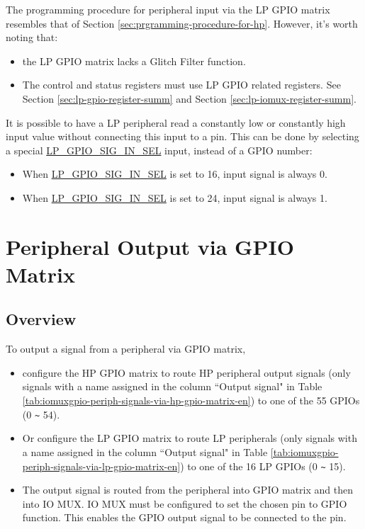 \documentclass[main\_\_EN.tex]{subfiles}
\begin{document}
The programming procedure for peripheral input via the LP GPIO matrix resembles that of Section \ref{sec:prgramming-procedure-for-hp}. However, it's worth noting that:\\
\begin{itemize}
    \item the LP GPIO matrix lacks a Glitch Filter function.
    \item The control and status registers must use LP GPIO related registers. See Section \ref{sec:lp-gpio-register-summ} and Section \ref{sec:lp-iomux-register-summ}.
\end{itemize}
\begin{tiplisting}
It is possible to have a LP peripheral read a constantly low or constantly high input value without connecting this input to a pin. This can be done by selecting a special \hyperref[fielddesc:LPGPIOSIGNINSEL]{LP\_GPIO\_SIG\_IN\_SEL} input, instead of a GPIO number:
\begin {itemize}
\item When \hyperref[fielddesc:LPGPIOSIGNINSEL]{LP\_GPIO\_SIG\_IN\_SEL} is set to 16, input signal is always 0.
\item When \hyperref[fielddesc:LPGPIOSIGNINSEL]{LP\_GPIO\_SIG\_IN\_SEL} is set to 24, input signal is always 1.
\end{itemize}
\end{tiplisting}


\section{Peripheral Output via GPIO Matrix}
\label{sec:peripheral-output-via-gpio-matrix}

\subsection{Overview}

To output a signal from a peripheral via GPIO matrix,
\begin{itemize}
    \item configure the HP GPIO matrix to route HP peripheral output signals (only signals with a name assigned in the column ``Output signal" in Table \ref{tab:iomuxgpio-periph-signals-via-hp-gpio-matrix-en}) to one of the 55 GPIOs (0 \verb+~+ 54).
    \item Or configure the LP GPIO matrix to route LP peripherals (only signals with a name assigned in the column ``Output signal" in Table \ref{tab:iomuxgpio-periph-signals-via-lp-gpio-matrix-en}) to one of the 16 LP GPIOs (0 \verb+~+ 15).
    \item The output signal is routed from the peripheral into GPIO matrix and then into IO MUX. IO MUX must be configured to set the chosen pin to GPIO function. This enables the GPIO output signal to be connected to the pin.
\end{itemize}
\end{document}

